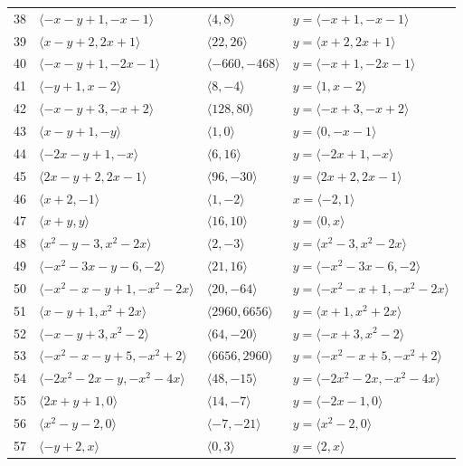 \documentclass[11pt]{article}
\begin{document}
\begin{longtable}{@{}rlll@{}}
38 & $\langle -x-y+1,-x-1\rangle$ & $\langle 4,8\rangle$ & $y=\langle -x+1,-x-1\rangle$\\
39 & $\langle x-y+2,2x+1\rangle$ & $\langle 22,26\rangle$ & $y=\langle x+2,2x+1\rangle$\\
40 & $\langle -x-y+1,-2x-1\rangle$ & $\langle -660,-468\rangle$ & $y=\langle -x+1,-2x-1\rangle$\\
41 & $\langle -y+1,x-2\rangle$ & $\langle 8,-4\rangle$ & $y=\langle 1,x-2\rangle$\\
42 & $\langle -x-y+3,-x+2\rangle$ & $\langle 128,80\rangle$ & $y=\langle -x+3,-x+2\rangle$\\
43 & $\langle x-y+1,-y\rangle$ & $\langle 1,0\rangle$ & $y=\langle 0,-x-1\rangle$\\
44 & $\langle -2x-y+1,-x\rangle$ & $\langle 6,16\rangle$ & $y=\langle -2x+1,-x\rangle$\\
45 & $\langle 2x-y+2,2x-1\rangle$ & $\langle 96,-30\rangle$ & $y=\langle 2x+2,2x-1\rangle$\\
46 & $\langle x+2,-1\rangle$ & $\langle 1,-2\rangle$ & $x=\langle -2,1\rangle$\\
47 & $\langle x+y,y\rangle$ & $\langle 16,10\rangle$ & $y=\langle 0,x\rangle$\\
48 & $\langle x^{2}-y-3,x^{2}-2x\rangle$ & $\langle 2,-3\rangle$ & $y=\langle x^{2}-3,x^{2}-2x\rangle$\\
49 & $\langle -x^{2}-3x-y-6,-2\rangle$ & $\langle 21,16\rangle$ & $y=\langle -x^{2}-3x-6,-2\rangle$\\
50 & $\langle -x^{2}-x-y+1,-x^{2}-2x\rangle$ & $\langle 20,-64\rangle$ & $y=\langle -x^{2}-x+1,-x^{2}-2x\rangle$\\
51 & $\langle x-y+1,x^{2}+2x\rangle$ & $\langle 2960,6656\rangle$ & $y=\langle x+1,x^{2}+2x\rangle$\\
52 & $\langle -x-y+3,x^{2}-2\rangle$ & $\langle 64,-20\rangle$ & $y=\langle -x+3,x^{2}-2\rangle$\\
53 & $\langle -x^{2}-x-y+5,-x^{2}+2\rangle$ & $\langle 6656,2960\rangle$ & $y=\langle -x^{2}-x+5,-x^{2}+2\rangle$\\
54 & $\langle -2x^{2}-2x-y,-x^{2}-4x\rangle$ & $\langle 48,-15\rangle$ & $y=\langle -2x^{2}-2x,-x^{2}-4x\rangle$\\
55 & $\langle 2x+y+1,0\rangle$ & $\langle 14,-7\rangle$ & $y=\langle -2x-1,0\rangle$\\
56 & $\langle x^{2}-y-2,0\rangle$ & $\langle -7,-21\rangle$ & $y=\langle x^{2}-2,0\rangle$\\
57 & $\langle -y+2,x\rangle$ & $\langle 0,3\rangle$ & $y=\langle 2,x\rangle$\\

\end{longtable}
\end{document}
